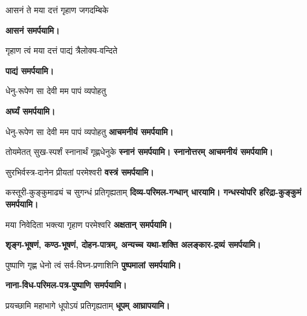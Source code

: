 \begin{center}

{आसनं ते मया दत्तं गृहाण जगदम्बिके}

\textbf{\devAya{} आसनं समर्पयामि।}

{गृहाण त्वं मया दत्तं पाद्यं त्रैलोक्य-वन्दिते}

\textbf{\devAya{} पाद्यं समर्पयामि।}

{धेनु-रूपेण सा देवी मम पापं व्यपोहतु}

\textbf{\devAya{} अर्घ्यं समर्पयामि।}

{धेनु-रूपेण सा देवी मम पापं व्यपोहतु}
\textbf{\devAya{} आचमनीयं समर्पयामि।}

{तोयमेतत् सुख-स्पर्शं स्नानार्थं गृह्ण\footnotemark[\value{footnote}] धेनुके}
\textbf{\devAya{} स्नानं समर्पयामि। स्नानोत्तरम् आचमनीयं समर्पयामि।}

{सुरभिर्वस्त्र-दानेन प्रीयतां परमेश्वरी}
\textbf{\devAya{} वस्त्रं समर्पयामि।}

{कस्तूरी-कुङ्कुमाढ्यं च सुगन्धं प्रतिगृह्यताम्}
\textbf{\devAya{} दिव्य-परिमल-गन्धान् धारयामि। गन्धस्योपरि हरिद्रा-कुङ्कुमं समर्पयामि।}\

{मया निवेदिता भक्त्या गृहाण परमेश्वरि}
\textbf{\devAya{} अक्षतान् समर्पयामि।}

\textbf{\devAya{} शृङ्ग-भूषणं, कण्ठ-भूषणं, दोहन-पात्रम्, अन्यच्च यथा-शक्ति अलङ्कार-द्रव्यं समर्पयामि।}

{पुष्पाणि गृह्ण धेनो त्वं सर्व-विघ्न-प्रणाशिनि}
\textbf{\devAya{} पुष्पमालां समर्पयामि।}


\begingroup
\centering
\setlength{\columnseprule}{1pt}
\let\chapt\sect

\endgroup

\textbf{\devAya{} नाना-विध-परिमल-पत्र-पुष्पाणि समर्पयामि।}\\


{प्रयच्छामि महाभागे धूपोऽयं प्रतिगृह्यताम्}
\textbf{\devAya{} धूपम् आघ्रापयामि।}


\end{center}
